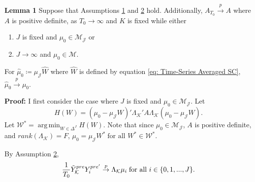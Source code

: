 \documentclass{article}
\DeclareMathOperator*{\argmin}{arg\,min}
\begin{document}


\textbf{Lemma 1} Suppose that Assumptions \hyperref[A1]{1} and \hyperref[A2]{2} hold. Additionally, $A_{T_0} \overset{p}{\rightarrow} A$ where $A$ is positive definite, as $T_0 \rightarrow \infty$ and $K$ is fixed while either
\begin{enumerate}[label=(\roman*)]
    \item $J$ is fixed and $\mu_0 \in \mathcal{M}_{\mathcal{J}}$ or
    \item $J \rightarrow \infty$ and $\mu_0 \in \mathcal{M}$.
\end{enumerate}
For $\hat{\mu}_0 \coloneqq \mu_{\mathcal{J}}\hat{W}$ where $\hat{W}$ is defined by equation \eqref{eq: Time-Series Averaged SC}, $\hat{\mu}_0 \overset{p}{\rightarrow} \mu_0$.

\textbf{Proof:} 
 I first consider the case where $J$ is fixed and $\mu_0 \in \mathcal{M}_{\mathcal{J}}$.  Let $$H (W) = (\mu_0 - \mu_{\mathcal{J}}W)'\Lambda_{\mathcal{K}}'A\Lambda_{\mathcal{K}}(\mu_0 - \mu_{\mathcal{J}}W).$$ Let $\mathcal{W}^* = \argmin_{W \in \Delta^J} H (W)$. Note that since $\mu_0 \in \mathcal{M}_{\mathcal{J}}$, $A$ is positive definite, and $rank(\Lambda_{\mathcal{K}}) = F$, $\mu_0 = \mu_{\mathcal{J}}W^* \; \text{for all } W^* \in \mathcal{W}^*$.


By Assumption \hyperref[A2]{2}, 
\begin{equation*}
    \frac{1}{T_0} \Tilde{Y}_{\mathcal{K}}^{pre}Y_{i}^{pre'}  \overset{p}{\rightarrow} \Lambda_{\mathcal{K}}\mu_i \; \text{for all } i \in \{0,1,...,J\}.
\end{equation*}
\end{document}
